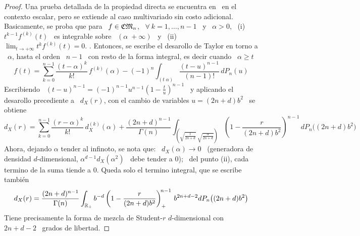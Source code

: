 \begin{proof}
  Una prueba detallada  de la propiedad directa se  encuentra en~\cite{Wil56} en
  el  contexto  escalar,  pero  se  extiende  al  caso  multivariado  sin  costo
  adicional.  Basicamente, se proba que para \  $f \in \mathfrak{CM}_n$, \ $\forall \: k =
  1,  \ldots ,  n-1$ \  y \  $\alpha >  0$, \  (i) \  $t^{k-1} f^{(k)}(t)$  \ es
  integrable sobre \  $(\alpha \; +\infty)$ \ y \  (ii) \ $\displaystyle \lim_{t
    \to +\infty} t^k f^{(k)}(t) = 0$. .   Entonces, se  escribe el  desarollo de Taylor  en torno  a \
  $\alpha$, hasta el  orden \ $n-1$ \  con resto de la forma  integral, es decir
  cuando \ $\alpha \ge t$
  \[
  f(t) =  \sum_{k=0}^{n-1} \frac{(t-\alpha)^k}{k!}  \,  f^{(k)}(\alpha) - (-1)^n
  \int_{(t \; \alpha)} \frac{(t-u)^{n-1}}{(n-1)!}  \, dP_n(u)
  \]
  Escribiendo  \  $(t-u)^{n-1}  =  (-1)^{n-1}  u^{n-1} \left(  1  -  \frac{t}{u}
  \right)^{n-1}$ \  y aplicando  el desarollo precediente  a \ $d_X(r)$,  con el
  cambio de variables $u = (2 n + d) b^2$ \ se obtiene
  \[
  d_X(r)  =  \sum_{k=0}^{n-1}  \frac{(r-\alpha)^k}{k!}  \,  d_X^{(k)}(\alpha)  +
  \frac{(2  n + d)^{n-1}}{\Gamma(n)}  \int_{\left( \sqrt{\frac{t}{2  n +  d}} \;
      \sqrt{\frac{\alpha}{2 n + d}} \right)} \left(  1 - \frac{r}{(2 n + d) b^2}
  \right)^{n-1} \, dP_n\big( (2 n + d) b^2 \big)
  \]
  Ahora, dejando $\alpha$ tender al infinoto, se nota que: \ $d_X(\alpha) \to 0$
  \ (generadora de densidad $d$-dimensional, $\alpha^{d-1} d_X(\alpha^2)$ \ debe
  tender a 0); \ del punto (ii), cada  termino de la suma tiende a 0. Queda solo
  el termino integral, que se escribe tambi\'en
  \[
  d_X(r) =  \frac{(2 n +  d)^{n-1}}{\Gamma(n)} \int_{\mathbb{R}_+} b^{-d} \left(  1 -
    \frac{r}{(2 n + d) b^2} \right)_+^{\!n-1} \, b^{2 n +d - 2} dP_n\big( (2 n +
  d) b^2 \big)
  \]
  Tiene precisamente la forma de  mezcla de Student-$r$ $d$-dimensional con \ $2
  n + d -  2$ \ grados de libertad.
\end{proof}

